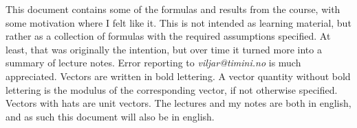 \author{Viljar Johan Femoen}

\flushbottom
\maketitle
\thispagestyle{empty}
\vskip 20pt
\vskip 2pt
\noindent This document contains some of the formulas and results from the course, with some motivation where I felt like it. 
This is not intended as learning material, but rather as a collection of formulas with the required assumptions specified. 
At least, that was originally the intention, but over time it turned more into a summary of lecture notes.
Error reporting to \textit{viljar@timini.no} is much appreciated. 
Vectors are written in bold lettering.
A vector quantity without bold lettering is the modulus of the corresponding vector, if not otherwise specified. 
Vectors with hats are unit vectors.
The lectures and my notes are both in english, and as such this document will also be in english.

\tableofcontents